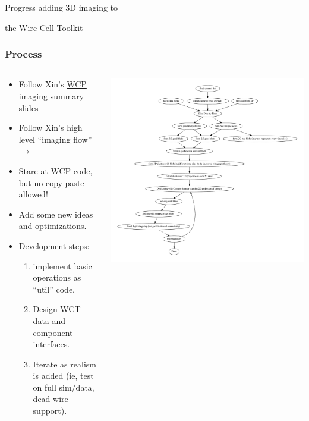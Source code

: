 \documentclass[xcolor=dvipsnames]{beamer}
\begin{document}
\begin{frame}
  \begin{center}
    \huge
    Progress adding 3D imaging to

    the Wire-Cell Toolkit
  \end{center}
\end{frame}

\begin{frame}
  \frametitle{Process}
  \begin{columns}
    \begin{column}{0.5\textwidth}
      \begin{itemize}
      \item Follow Xin's  \href{https://www.phy.bnl.gov/~bviren/tmp/wctimg/integration_imaging.pptx}{WCP imaging summary slides}
      \item Follow Xin's high level ``imaging flow'' $\rightarrow$
      \item Stare at WCP code, but no copy-paste allowed! \smiley{}
      \item Add some new ideas and optimizations.
      \item Development steps:
        \begin{enumerate}\scriptsize
        \item implement basic operations as ``util'' code.
        \item Design WCT data and component interfaces.
        \item Iterate as realism is added (ie, test on full sim/data, dead wire support).
        \end{enumerate}
      \end{itemize}
    \end{column}
    \begin{column}{0.5\textwidth}
      \includegraphics[width=1.1\textwidth]{imaging_flow.pdf}
    \end{column}
  \end{columns}
\end{frame}
\end{document}
